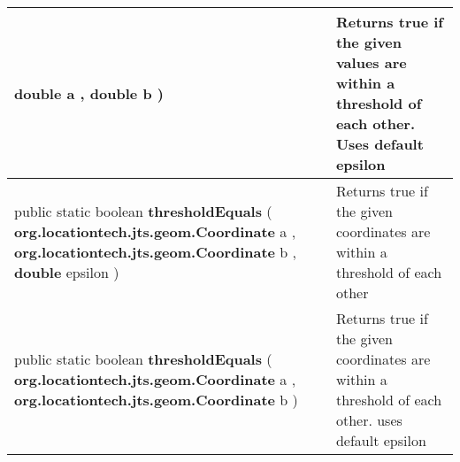 {\begin{tabularx}{\linewidth}{m{}|m{}}
\begin{raggedleft}
\hspace*{ 5pt} \textbf{double} a , \newline
 \hspace*{ 5pt} \textbf{double} b  )
\end{raggedleft} &
 Returns true if the given values are within a threshold of each other. Uses default epsilon\\ \hline 
\begin{raggedleft}public static boolean \textbf{thresholdEquals }(\newline \hfill 
\hspace*{ 5pt} \textbf{org.locationtech.jts.geom.Coordinate} a , \newline
 \hspace*{ 5pt} \textbf{org.locationtech.jts.geom.Coordinate} b , \newline
 \hspace*{ 5pt} \textbf{double} epsilon  )
\end{raggedleft} &
 Returns true if the given coordinates are within a threshold of each other\\ \hline 
\begin{raggedleft}public static boolean \textbf{thresholdEquals }(\newline \hfill 
\hspace*{ 5pt} \textbf{org.locationtech.jts.geom.Coordinate} a , \newline
 \hspace*{ 5pt} \textbf{org.locationtech.jts.geom.Coordinate} b  )
\end{raggedleft} &
 Returns true if the given coordinates are within a threshold of each other. uses default epsilon\\\end{tabularx}
}
